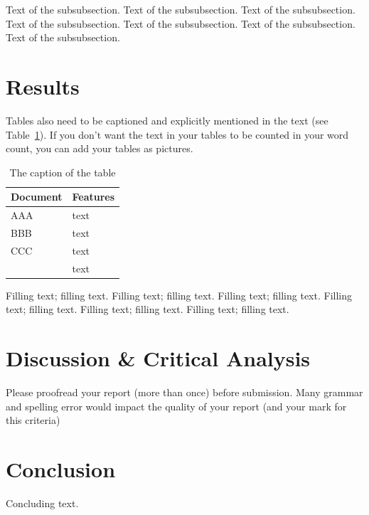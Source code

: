 \documentclass[11pt]{article}
\begin{document}
Text of the subsubsection.
Text of the subsubsection.
Text of the subsubsection.
Text of the subsubsection.
Text of the subsubsection.
Text of the subsubsection.
Text of the subsubsection.

\section{Results}
Tables also need to be captioned and explicitly mentioned in the text (see Table~\ref{table1}). If you don't want the text in your tables to be counted in your word count, you can add your tables as pictures.

\begin{table}[h]
	\begin{center}
		\begin{tabular}{|l|l|}			
			\hline
			Document & Features\\
			\hline\hline
			AAA & text\\
			BBB & text\\
			CCC & text\\
			& text\\
			\hline
			
		\end{tabular}
		\caption{The caption of the table}
		\label{table1}
		
	\end{center}
\end{table}

Filling text; filling text.
Filling text; filling text.
Filling text; filling text.
Filling text; filling text.
Filling text; filling text.
Filling text; filling text.

\section{Discussion \& Critical Analysis}

Please proofread your report (more than once) before submission. Many grammar and spelling error would impact the quality of your report (and your mark for this criteria)

\section{Conclusion}

Concluding text.



\end{document}
